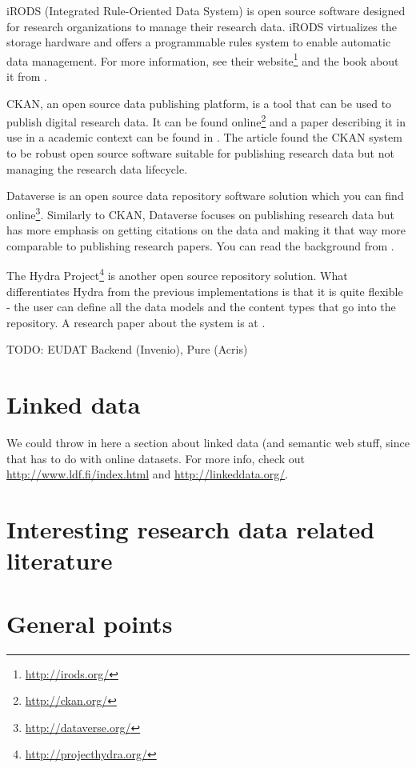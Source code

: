 iRODS (Integrated Rule-Oriented Data System) is open source software designed
for research organizations to manage their research data. iRODS virtualizes the
storage hardware and offers a programmable rules system to enable automatic
data management. For more information, see their website\footnote{\url{http://irods.org/}} and
the book about it from \cite{DBLP:series/synthesis/2010Rajasekar}.

CKAN, an open source data publishing platform, is a tool that can be used to
publish digital research data. It can be found online\footnote{\url{http://ckan.org/}} and
a paper describing it in use in a academic context can be found in
\cite{winn2013open}. The article found the CKAN system to be robust open source
software suitable for publishing research data but not managing the research
data lifecycle.

Dataverse is an open source data repository software solution which you can
find online\footnote{\url{http://dataverse.org/}}. Similarly to CKAN, Dataverse
focuses on publishing research data but has more emphasis on getting
citations on the data and making it that way more comparable to publishing
research papers. You can read the background from \cite{king2007introduction}.

The Hydra Project\footnote{\url{http://projecthydra.org/}} is another open
source repository solution. What differentiates Hydra from the previous
implementations is that it is quite flexible - the user can define all the data
models and the content types that go into the repository. A research paper
about the system is at \cite{awre2009project}.

TODO: EUDAT Backend (Invenio), Pure (Acris)

\section{Linked data}

We could throw in here a section about linked data (and semantic web stuff,
since that has to do with online datasets. For more info, check out
\url{http://www.ldf.fi/index.html} and \url{http://linkeddata.org/}.

\iffalse

\section{Interesting research data related literature}

\section{General points}

